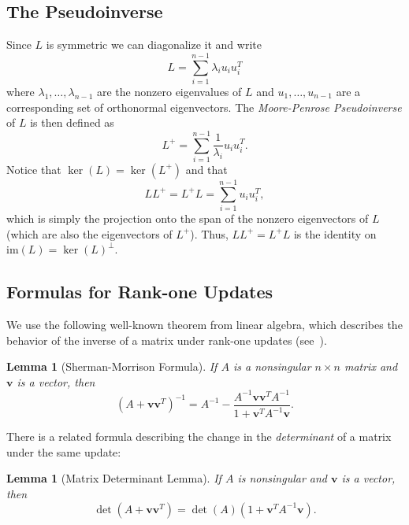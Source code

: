 \documentclass[12pt]{article}
\newcommand{\cross}{+}
\newcommand{\im}{\mathrm{im}}
\newtheorem{lemma}[theorem]{Lemma}
\newcommand\ppi{\mathbf{v}}
\begin{document}
\subsection{The Pseudoinverse}\label{sec:pseudo}
Since $L$ is symmetric we can diagonalize it and write
\[ L=\sum_{i=1}^{n-1}\lambda_i u_iu_i^{T} \]
where $\lambda_1,\ldots,\lambda_{n-1}$ are the nonzero eigenvalues of $L$ and
$u_1,\ldots,u_{n-1}$ are a corresponding set of orthonormal eigenvectors. The {\em
Moore-Penrose Pseudoinverse} of $L$ is then defined as
\[ L^\cross=\sum_{i=1}^{n-1}\frac{1}{\lambda_i} u_iu_i^{T} .\]
Notice that $\ker(L)=\ker(L^\cross)$ and that
\[ LL^\cross=L^\cross L=\sum_{i=1}^{n-1}u_iu_i^{T} ,\]
which is simply the projection onto the span of the
nonzero eigenvectors of $L$ (which are also the eigenvectors of $L^\cross$). Thus, $LL^\cross=L^\cross L$ is the identity on
$\im(L)=\ker(L)^\perp$.

\subsection{Formulas for Rank-one Updates}
We use the following well-known theorem from linear algebra, which describes
the behavior of the inverse of a matrix under rank-one updates 
  (see~\cite[Section 2.1.3]{GolubVanLoan}).
\begin{lemma}[Sherman-Morrison Formula] If $A$ is a nonsingular $n\times n$ matrix and $\ppi$ is a vector, then 
\[(A+\ppi\ppi^{T} )^{-1}= A^{-1}-\frac{A^{-1}\ppi\ppi^{T} A^{-1}}{1+\ppi^{T} A^{-1}\ppi}.\]
\end{lemma}
There is a related formula describing the change in the {\em determinant} of
  a matrix under the same update:
\begin{lemma}[Matrix Determinant Lemma] \label{lem:matrixdet} If $A$ is nonsingular and $\ppi$ is a vector, then
\[ \det(A+\ppi\ppi^T) = \det(A)(1+\ppi^T A^{-1} \ppi).\]\end{lemma}
\end{document}
